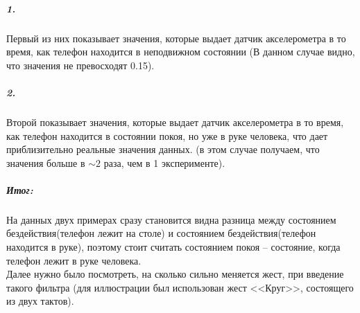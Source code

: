 \begin{figure}[H]
\end{figure}

\subparagraph{1.} Первый из них показывает значения, которые выдает датчик акселерометра в то время, как телефон находится в неподвижном состоянии (В данном случае видно, что значения не превосходят 0.15).
\subparagraph{2.} Второй показывает значения, которые выдает датчик акселерометра в то время, как телефон находится в состоянии покоя, но уже в руке человека, что дает приблизительно реальные значения данных. (в этом случае получаем, что значения больше в $\sim 2$ раза, чем в 1 эксперименте).
\subparagraph{Итог:}
На данных двух примерах сразу становится видна разница между состоянием бездействия(телефон лежит на столе) и состоянием бездействия(телефон находится в руке), поэтому стоит считать состоянием покоя -- состояние, когда телефон лежит в руке человека. \\
Далее нужно было посмотреть, на сколько сильно меняется жест, при введение такого фильтра (для иллюстрации был использован жест <<Круг>>, состоящего из двух тактов).

